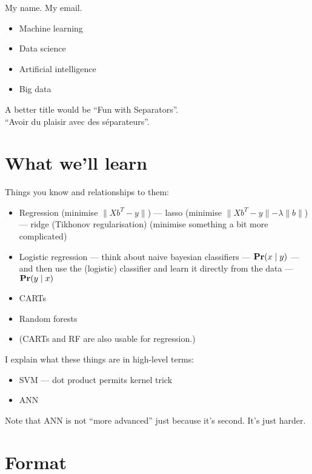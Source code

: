 




My name.  My email.

\begin{itemize}
\item Machine learning
\item Data science
\item Artificial intelligence
\item Big data
\end{itemize}

A better title would be ``Fun with Separators''.\\
``Avoir du plaisir avec des séparateurs''.

\section*{What we'll learn}

Things you know and relationships to them:
\begin{itemize}
\item Regression (minimise $\parallel Xb^T-y\parallel$) --- lasso (minimise $\parallel Xb^T-y\parallel - \lambda\parallel b\parallel $) --- ridge (Tikhonov regularisation) (minimise something a bit more complicated)
\item Logistic regression --- think about naive bayesian classifiers --- $\mathbf{Pr}(x\mid y)$ --- and then use the (logistic) classifier and learn it directly from the data --- $\mathbf{Pr}(y\mid x)$
\item CARTs
\item Random forests
\item (CARTs and RF are also usable for regression.)
\end{itemize}

I explain what these things are in high-level terms:

\begin{itemize}
\item SVM --- dot product permits kernel trick
\item ANN
\end{itemize}

Note that ANN is not ``more advanced'' just because it's second.  It's
just harder.


\section*{Format}


